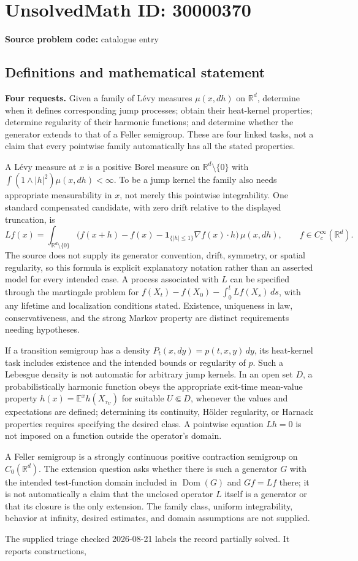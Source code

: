 \documentclass[11pt]{article}
\newcommand{\R}{\mathbb{R}}
\begin{document}
\section*{UnsolvedMath ID: 30000370}
\textbf{Source problem code:} catalogue entry
\subsection{Definitions and mathematical statement}
\textbf{Four requests.} Given a family of L\'evy measures \(\mu(x,dh)\) on \(\R^d\), determine when it defines corresponding jump processes; obtain their heat-kernel properties; determine regularity of their harmonic functions; and determine whether the generator extends to that of a Feller semigroup. These are four linked tasks, not a claim that every pointwise family automatically has all the stated properties.\par A L\'evy measure at \(x\) is a positive Borel measure on \(\R^d\setminus\{0\}\) with \(\int(1\wedge|h|^2)\mu(x,dh)<\infty\). To be a jump kernel the family also needs appropriate measurability in \(x\), not merely this pointwise integrability. One standard compensated candidate, with zero drift relative to the displayed truncation, is\[Lf(x)=\int_{\R^d\setminus\{0\}}\bigl(f(x+h)-f(x)-\mathbf1_{\{|h|\le1\}}\nabla f(x)\cdot h\bigr)\,\mu(x,dh),\qquad f\in C_c^\infty(\R^d).\] The source does not supply its generator convention, drift, symmetry, or spatial regularity, so this formula is explicit explanatory notation rather than an asserted model for every intended case. A process associated with \(L\) can be specified through the martingale problem for \(f(X_t)-f(X_0)-\int_0^tLf(X_s)\,ds\), with any lifetime and localization conditions stated. Existence, uniqueness in law, conservativeness, and the strong Markov property are distinct requirements needing hypotheses.\par If a transition semigroup has a density \(P_t(x,dy)=p(t,x,y)\,dy\), its heat-kernel task includes existence and the intended bounds or regularity of \(p\). Such a Lebesgue density is not automatic for arbitrary jump kernels. In an open set \(D\), a probabilistically harmonic function obeys the appropriate exit-time mean-value property \(h(x)=\mathbb E^x h(X_{\tau_U})\) for suitable \(U\Subset D\), whenever the values and expectations are defined; determining its continuity, H\"older regularity, or Harnack properties requires specifying the desired class. A pointwise equation \(Lh=0\) is not imposed on a function outside the operator's domain.\par A Feller semigroup is a strongly continuous positive contraction semigroup on \(C_0(\R^d)\). The extension question asks whether there is such a generator \(G\) with the intended test-function domain included in \(\operatorname{Dom}(G)\) and \(Gf=Lf\) there; it is not automatically a claim that the unclosed operator \(L\) itself is a generator or that its closure is the only extension. The family class, uniform integrability, behavior at infinity, desired estimates, and domain assumptions are not supplied.\par The supplied triage checked 2026-08-21 labels the record partially solved. It reports constructions, 
\end{document}
